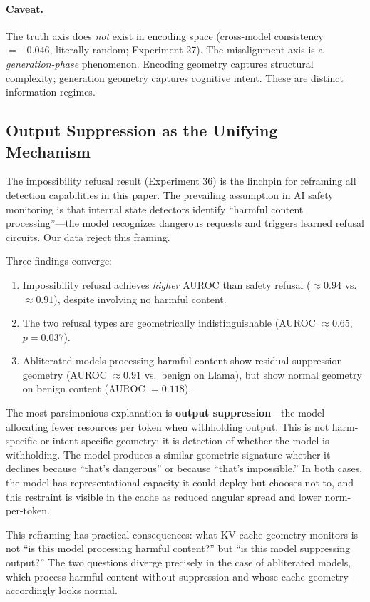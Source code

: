 \paragraph{Caveat.} The truth axis does \emph{not} exist in encoding space (cross-model consistency $= -0.046$, literally random; Experiment 27). The misalignment axis is a \emph{generation-phase} phenomenon. Encoding geometry captures structural complexity; generation geometry captures cognitive intent. These are distinct information regimes.

\subsection{Output Suppression as the Unifying Mechanism}

The impossibility refusal result (Experiment 36) is the linchpin for reframing all detection capabilities in this paper. The prevailing assumption in AI safety monitoring is that internal state detectors identify ``harmful content processing''---the model recognizes dangerous requests and triggers learned refusal circuits. Our data reject this framing.

Three findings converge:
\begin{enumerate}[leftmargin=*]
    \item Impossibility refusal achieves \emph{higher} AUROC than safety refusal ($\approx 0.94$ vs.\ $\approx 0.91$), despite involving no harmful content.
    \item The two refusal types are geometrically indistinguishable (AUROC $\approx 0.65$, $p = 0.037$).
    \item Abliterated models processing harmful content show residual suppression geometry (AUROC $\approx 0.91$ vs.\ benign on Llama), but show normal geometry on benign content (AUROC $= 0.118$).
\end{enumerate}

The most parsimonious explanation is \textbf{output suppression}---the model allocating fewer resources per token when withholding output. This is not harm-specific or intent-specific geometry; it is detection of whether the model is withholding. The model produces a similar geometric signature whether it declines because ``that's dangerous'' or because ``that's impossible.'' In both cases, the model has representational capacity it could deploy but chooses not to, and this restraint is visible in the cache as reduced angular spread and lower norm-per-token.

This reframing has practical consequences: what KV-cache geometry monitors is not ``is this model processing harmful content?'' but ``is this model suppressing output?'' The two questions diverge precisely in the case of abliterated models, which process harmful content without suppression and whose cache geometry accordingly looks normal.

